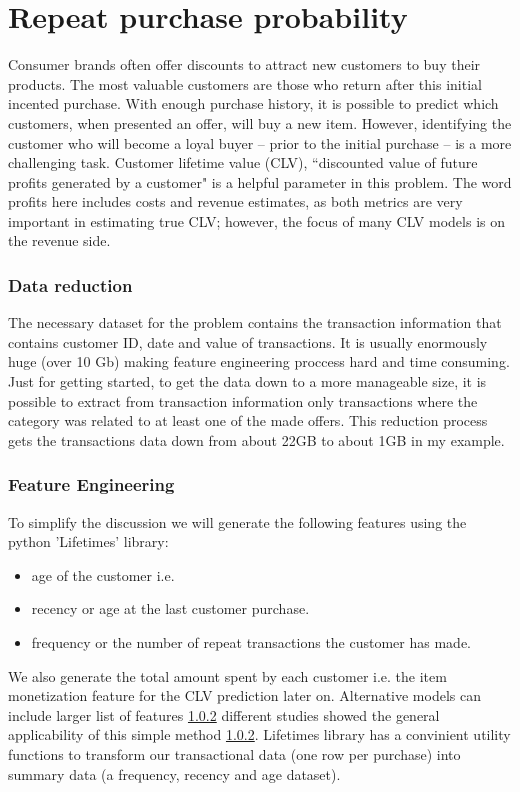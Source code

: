 \documentclass[11pt,fleqn]{book} %
\begin{document}


\chapter{Repeat purchase probability }

Consumer brands often offer discounts to attract new customers to buy their products. The most valuable customers are those who return after this initial incented purchase.  With enough purchase history, it is possible to predict which customers, when presented an offer, will buy a new item. However, identifying the customer who will become a loyal buyer -- prior to the initial purchase -- is a more challenging task.
Customer lifetime value (CLV), “discounted value of future profits generated by a customer" is a helpful parameter in this problem. The word profits here includes costs and revenue estimates, as both metrics are very important in estimating true CLV; however, the focus of many CLV models is on the revenue side. 

\subsection{Data reduction}
The necessary dataset for the problem contains the transaction information that contains customer ID, date and value of transactions. It is usually enormously huge (over 10 Gb) making feature engineering proccess hard and time consuming. Just for getting started, to get the data down to a more manageable size, it is possible to extract from transaction information only transactions where the category was related to at least one of the made offers. This reduction process gets the transactions data down from about 22GB to about 1GB in my example. %

\subsection{Feature Engineering}
To simplify the discussion we will generate the following features using the python 'Lifetimes' library:
\begin{itemize}
\item age of the customer i.e.
\item recency or age at the last customer purchase.
\item frequency or the number of repeat transactions the customer has made.
\end{itemize}
We also generate the total amount spent by each customer i.e. the item monetization feature for the CLV prediction later on. Alternative models can include larger list of features \ref{} different studies showed the general applicability of this simple method \ref{}. Lifetimes library has a convinient utility functions to transform our transactional data (one row per purchase) into summary data (a frequency, recency and age dataset).
\end{document}
